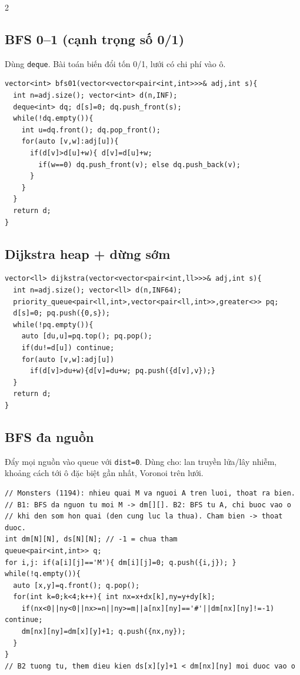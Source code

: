 \documentclass[8pt]{extarticle}
\begin{document}
\begin{multicols}{2}
\subsection{BFS 0--1 (cạnh trọng số 0/1)}
Dùng \texttt{deque}. Bài toán biến đổi tốn 0/1, lưới có chi phí vào ô.
\begin{lstlisting}
vector<int> bfs01(vector<vector<pair<int,int>>>& adj,int s){
  int n=adj.size(); vector<int> d(n,INF);
  deque<int> dq; d[s]=0; dq.push_front(s);
  while(!dq.empty()){
    int u=dq.front(); dq.pop_front();
    for(auto [v,w]:adj[u]){
      if(d[v]>d[u]+w){ d[v]=d[u]+w;
        if(w==0) dq.push_front(v); else dq.push_back(v);
      }
    }
  }
  return d;
}
\end{lstlisting}

\subsection{Dijkstra heap + dừng sớm}
\begin{lstlisting}
vector<ll> dijkstra(vector<vector<pair<int,ll>>>& adj,int s){
  int n=adj.size(); vector<ll> d(n,INF64);
  priority_queue<pair<ll,int>,vector<pair<ll,int>>,greater<>> pq;
  d[s]=0; pq.push({0,s});
  while(!pq.empty()){
    auto [du,u]=pq.top(); pq.pop();
    if(du!=d[u]) continue;
    for(auto [v,w]:adj[u])
      if(d[v]>du+w){d[v]=du+w; pq.push({d[v],v});}
  }
  return d;
}
\end{lstlisting}

\subsection{BFS đa nguồn}
Đẩy mọi nguồn vào queue với \texttt{dist=0}. Dùng cho: lan truyền lửa/lây nhiễm, khoảng cách tới ô đặc biệt gần nhất, Voronoi trên lưới.
\begin{lstlisting}
// Monsters (1194): nhieu quai M va nguoi A tren luoi, thoat ra bien.
// B1: BFS da nguon tu moi M -> dm[][]. B2: BFS tu A, chi buoc vao o
// khi den som hon quai (den cung luc la thua). Cham bien -> thoat duoc.
int dm[N][N], ds[N][N]; // -1 = chua tham
queue<pair<int,int>> q;
for i,j: if(a[i][j]=='M'){ dm[i][j]=0; q.push({i,j}); }
while(!q.empty()){
  auto [x,y]=q.front(); q.pop();
  for(int k=0;k<4;k++){ int nx=x+dx[k],ny=y+dy[k];
    if(nx<0||ny<0||nx>=n||ny>=m||a[nx][ny]=='#'||dm[nx][ny]!=-1) continue;
    dm[nx][ny]=dm[x][y]+1; q.push({nx,ny});
  }
}
// B2 tuong tu, them dieu kien ds[x][y]+1 < dm[nx][ny] moi duoc vao o
\end{lstlisting}


\end{multicols}
\end{document}
